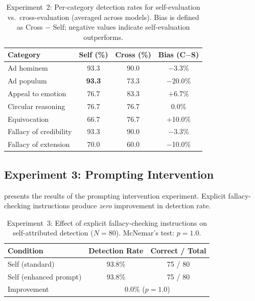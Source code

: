 \begin{table}[t]
    \centering
    \caption{Experiment~2: Per-category detection rates for self-evaluation vs.\ cross-evaluation (averaged across models). Bias is defined as Cross $-$ Self; negative values indicate self-evaluation outperforms.}
    \begin{tabular}{@{}lccc@{}}
        \toprule
        \textbf{Category} & \textbf{Self (\%)} & \textbf{Cross (\%)} & \textbf{Bias (C$-$S)} \\
        \midrule
        Ad hominem & 93.3 & 90.0 & $-$3.3\% \\
        Ad populum & \textbf{93.3} & 73.3 & $\mathbf{-20.0\%}$ \\
        Appeal to emotion & 76.7 & 83.3 & $+$6.7\% \\
        Circular reasoning & 76.7 & 76.7 & 0.0\% \\
        Equivocation & 66.7 & 76.7 & $+$10.0\% \\
        Fallacy of credibility & 93.3 & 90.0 & $-$3.3\% \\
        Fallacy of extension & 70.0 & 60.0 & $-$10.0\% \\
        \bottomrule
    \end{tabular}
    \label{tab:exp2_category}
\end{table}

\subsection{Experiment 3: Prompting Intervention}
\label{sec:results_exp3}

 presents the results of the prompting intervention experiment. Explicit fallacy-checking instructions produce \emph{zero} improvement in detection rate.

\begin{table}[t]
    \centering
    \caption{Experiment~3: Effect of explicit fallacy-checking instructions on self-attributed detection ($N = 80$). McNemar's test: $p = 1.0$.}
    \begin{tabular}{@{}lcc@{}}
        \toprule
        \textbf{Condition} & \textbf{Detection Rate} & \textbf{Correct / Total} \\
        \midrule
        Self (standard) & 93.8\% & 75 / 80 \\
        Self (enhanced prompt) & 93.8\% & 75 / 80 \\
        \midrule
        Improvement & \multicolumn{2}{c}{$0.0\%$ \quad ($p = 1.0$)} \\
        \bottomrule
    \end{tabular}
    \label{tab:exp3}
\end{table}

